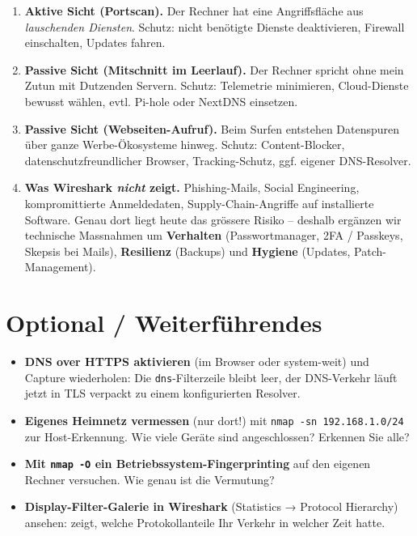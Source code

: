 \documentclass[
  nswissgerman,
  a4paper,
  DIV=11,
  numbers=noendperiod,
  ngerman]{scrreprt}
\providecommand{\tightlist}{%
  \setlength{\itemsep}{0pt}\setlength{\parskip}{0pt}}
\begin{document}
\begin{enumerate}
\def\labelenumi{\arabic{enumi}.}
\tightlist
\item
  \textbf{Aktive Sicht (Portscan).} Der Rechner hat eine Angriffsfläche
  aus \emph{lauschenden Diensten}. Schutz: nicht benötigte Dienste
  deaktivieren, Firewall einschalten, Updates fahren.
\item
  \textbf{Passive Sicht (Mitschnitt im Leerlauf).} Der Rechner spricht
  ohne mein Zutun mit Dutzenden Servern. Schutz: Telemetrie minimieren,
  Cloud-Dienste bewusst wählen, evtl. Pi-hole oder NextDNS einsetzen.
\item
  \textbf{Passive Sicht (Webseiten-Aufruf).} Beim Surfen entstehen
  Datenspuren über ganze Werbe-Ökosysteme hinweg. Schutz:
  Content-Blocker, datenschutzfreundlicher Browser, Tracking-Schutz,
  ggf. eigener DNS-Resolver.
\item
  \textbf{Was Wireshark \emph{nicht} zeigt.} Phishing-Mails, Social
  Engineering, kompromittierte Anmeldedaten, Supply-Chain-Angriffe auf
  installierte Software. Genau dort liegt heute das grössere Risiko --
  deshalb ergänzen wir technische Massnahmen um \textbf{Verhalten}
  (Passwortmanager, 2FA / Passkeys, Skepsis bei Mails),
  \textbf{Resilienz} (Backups) und \textbf{Hygiene} (Updates,
  Patch-Management).
\end{enumerate}

\section{Optional / Weiterführendes}\label{optional-weiterfuxfchrendes}

\begin{itemize}
\tightlist
\item
  \textbf{DNS over HTTPS aktivieren} (im Browser oder system-weit) und
  Capture wiederholen: Die \texttt{dns}-Filterzeile bleibt leer, der
  DNS-Verkehr läuft jetzt in TLS verpackt zu einem konfigurierten
  Resolver.
\item
  \textbf{Eigenes Heimnetz vermessen} (nur dort!) mit
  \texttt{nmap\ -sn\ 192.168.1.0/24} zur Host-Erkennung. Wie viele
  Geräte sind angeschlossen? Erkennen Sie alle?
\item
  \textbf{Mit \texttt{nmap\ -O} ein Betriebssystem-Fingerprinting} auf
  den eigenen Rechner versuchen. Wie genau ist die Vermutung?
\item
  \textbf{Display-Filter-Galerie in Wireshark} (Statistics → Protocol
  Hierarchy) ansehen: zeigt, welche Protokollanteile Ihr Verkehr in
  welcher Zeit hatte.
\end{itemize}
\end{document}
